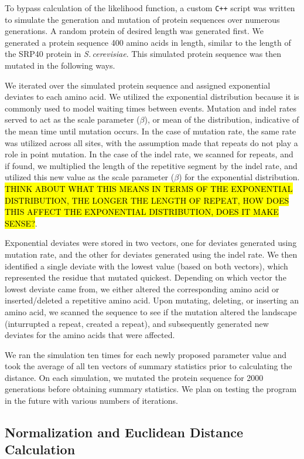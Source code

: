 \documentclass{article}
\newcommand{\scshrt}{\mbox{\textit{S.\,cerevisiae}}\xspace}
\begin{document}
To bypass calculation of the likelihood function, a custom \texttt{C++} script was written to simulate the generation and mutation of protein sequences over numerous generations. A random protein of desired length was generated first. We generated a protein sequence 400 amino acids in length, similar to the length of the SRP40 protein in \scshrt. This simulated protein sequence was then  mutated in the following ways.

We iterated over the simulated protein sequence and assigned exponential deviates to each amino acid. We utilized the exponential distribution because it is commonly used to model waiting times between events. Mutation and indel rates served to act as the scale parameter ($\beta$), or mean of the distribution, indicative of the mean time until mutation occurs. In the case of mutation rate, the same rate was utilized across all sites, with the assumption made that repeats do not play a role in point mutation. In the case of the indel rate, we scanned for repeats, and if found, we multiplied the length of the repetitive segment by the indel rate, and utilized this new value as the scale parameter ($\beta$) for the exponential distribution. \hl{THINK ABOUT WHAT THIS MEANS IN TERMS OF THE EXPONENTIAL DISTRIBUTION, THE LONGER THE LENGTH OF REPEAT, HOW DOES THIS AFFECT THE EXPONENTIAL DISTRIBUTION, DOES IT MAKE SENSE?}.

Exponential deviates were stored in two vectors, one for deviates generated using mutation rate, and the other for deviates generated using the indel rate. We then identified a single deviate with the lowest value (based on both vectors), which represented the residue that mutated quickest. Depending on which vector the lowest deviate came from, we either altered the corresponding amino acid or inserted/deleted a repetitive amino acid. Upon mutating, deleting, or inserting an amino acid, we scanned the sequence to see if the mutation altered the landscape (inturrupted a repeat, created a repeat), and subsequently generated new deviates for the amino acids that were affected.

We ran the simulation ten times for each newly proposed parameter value and took the average of all ten vectors of summary statistics prior to calculating the distance. On each simulation, we mutated the protein sequence for 2000 generations before obtaining summary statistics. We plan on testing the program in the future with various numbers of iterations.

\subsection{Normalization and Euclidean Distance Calculation}
\end{document}
